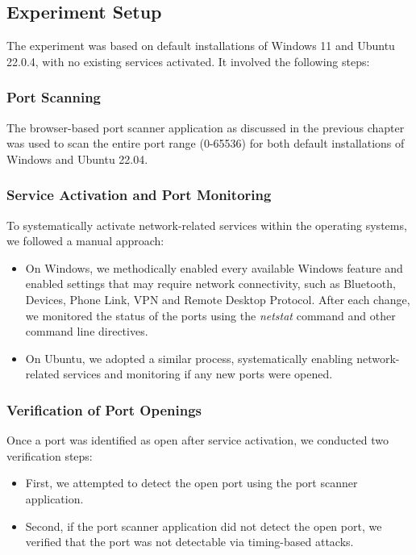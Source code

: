 \subsection{Experiment Setup}

The experiment was based on default installations of Windows 11 and Ubuntu 22.0.4, with no existing services activated. It involved the following steps:

\subsubsection{Port Scanning}

The browser-based port scanner application as discussed in the previous chapter was used to scan the entire port range (0-65536) for both default installations of Windows and Ubuntu 22.04.

\subsubsection{Service Activation and Port Monitoring}

To systematically activate network-related services within the operating systems, we followed a manual approach:

\begin{itemize}
    \item On Windows, we methodically enabled every available Windows feature and enabled settings that may require network connectivity, such as Bluetooth, Devices, Phone Link, VPN and Remote Desktop Protocol. After each change, we monitored the status of the ports using the \emph{netstat} command and other command line directives.
    \item On Ubuntu, we adopted a similar process, systematically enabling network-related services and monitoring if any new ports were opened.
\end{itemize}

\subsubsection{Verification of Port Openings}

Once a port was identified as open after service activation, we conducted two verification steps:

\begin{itemize}
    \item First, we attempted to detect the open port using the port scanner application. 
    \item Second, if the port scanner application did not detect the open port, we verified that the port was not detectable via timing-based attacks.
\end{itemize}

